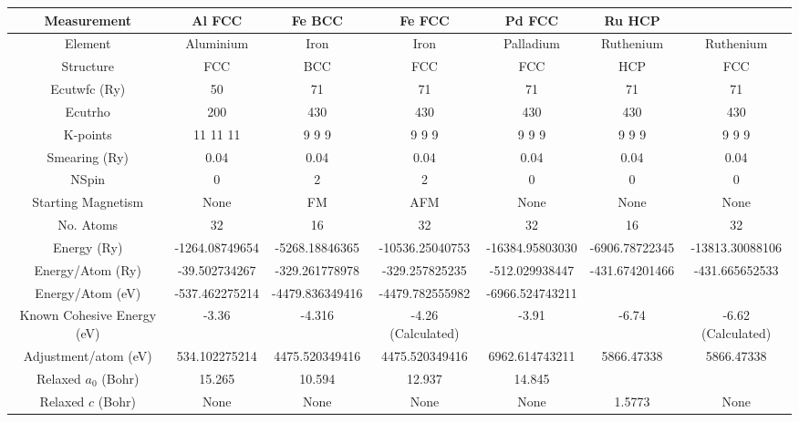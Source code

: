 \clearpage
\begin{landscape}

\begin{table}[h]
\begin{center}
\renewcommand{\arraystretch}{1.2}
\begin{tabular}{c c c c c c c}
\hline\hline
Measurement & Al FCC & Fe BCC & Fe FCC & Pd FCC & Ru HCP \\
\hline\hline
Element                    & Aluminium & Iron & Iron & Palladium & Ruthenium & Ruthenium \\
Structure                  & FCC  & BCC  & FCC  & FCC  & HCP  & FCC     \\
Ecutwfc (Ry)               & 50  & 71  & 71  & 71  & 71  & 71    \\
Ecutrho                    & 200 & 430  & 430  & 430 & 430  & 430   \\
K-points                   & 11 11 11 & 9 9 9  & 9 9 9  &  9 9 9  &  9 9 9  &  9 9 9  \\ 
Smearing (Ry)              & 0.04  & 0.04  & 0.04  & 0.04 & 0.04 & 0.04   \\ 
NSpin                      & 0 & 2  & 2  & 0 & 0 & 0  \\ 
Starting Magnetism         & None & FM  & AFM  & None  & None  & None   \\ 
No. Atoms                  & 32  & 16  & 32  & 32 & 16 & 32  \\  
Energy (Ry)                & -1264.08749654  & -5268.18846365   & -10536.25040753    & -16384.95803030  & -6906.78722345  & -13813.30088106  \\
Energy/Atom (Ry)           & -39.502734267   & -329.261778978   & -329.257825235     & -512.029938447 & -431.674201466 & -431.665652533  \\
Energy/Atom (eV)           & -537.462275214  & -4479.836349416  & -4479.782555982    & -6966.524743211   \\
Known Cohesive Energy (eV) & -3.36           & -4.316           & -4.26 (Calculated) & -3.91  & -6.74  & -6.62 (Calculated)             \\
Adjustment/atom (eV)       &  534.102275214  &  4475.520349416  &  4475.520349416    &  6962.614743211 & 5866.47338  &  5866.47338 \\
Relaxed $a_0$ (Bohr)       & 15.265          & 10.594           & 12.937             & 14.845            \\
Relaxed $c$ (Bohr)       & None  & None  & None  & None  & 1.5773  & None \\

\end{tabular}
\end{center}
\end{table}
\end{landscape}
